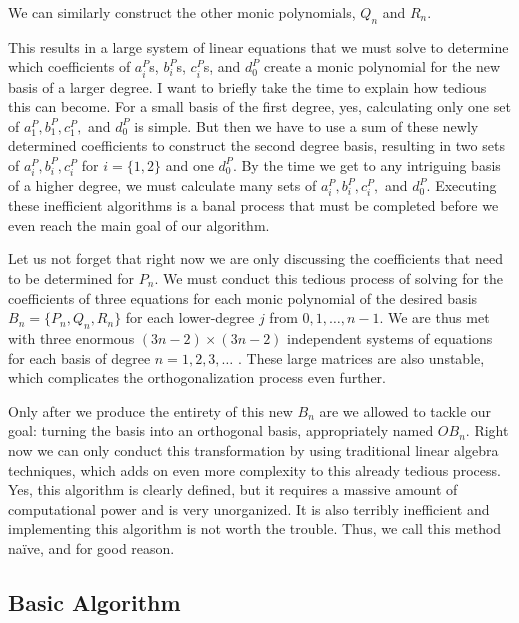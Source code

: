 \documentclass[letterpaper, 12pt]{article}
\begin{document}
\doublespacing
\smallskip
\noindent We can similarly construct the other monic polynomials, $Q_n$ and $R_n$.

This results in a large system of linear equations that we must solve to determine which coefficients of $a_i^P$s, $b_i^P$s, $c_i^P$s, and $d_0^P$ create a monic polynomial for the new basis of a larger degree. I want to briefly take the time to explain how tedious this can become. For a small basis of the first degree, yes, calculating only one set of $a_1^P, b_1^P, c_1^P,$ and $d_0^P$ is simple. But then we have to use a sum of these newly determined coefficients to construct the second degree basis, resulting in two sets of $a_i^P,b_i^P,c_i^P$ for $i=\{1,2\}$ and one $d_0^P$. By the time we get to any intriguing basis of a higher degree, we must calculate many sets of $a_i^P,b_i^P,c_i^P,$ and $d_0^P$. Executing these inefficient algorithms is a banal process that must be completed before we even reach the main goal of our algorithm. 

Let us not forget that right now we are only discussing the coefficients that need to be determined for $P_n$. We must conduct this tedious process of solving for the coefficients of three equations for each monic polynomial of the desired basis $B_n = \{P_n, Q_n, R_n\}$ for each lower-degree $j$ from $0, 1, \ldots, n-1$. We are thus met with three enormous $(3n-2)\times(3n-2)$ independent systems of equations for each basis of degree $n = 1, 2, 3, \ldots$ . These large matrices are also unstable, which complicates the orthogonalization process even further.

Only after we produce the entirety of this new $B_n$ are we allowed to tackle our goal: turning the basis into an orthogonal basis, appropriately named $OB_n$. Right now we can only conduct this transformation by using traditional linear algebra techniques, which adds on even more complexity to this already tedious process. Yes, this algorithm is clearly defined, but it requires a massive amount of computational power and is very unorganized. It is also terribly inefficient and implementing this algorithm is not worth the trouble. Thus, we call this method na\"ive, and for good reason. 







\newpage
\begin{centering}\section{Basic Algorithm}\end{centering}
\end{document}
